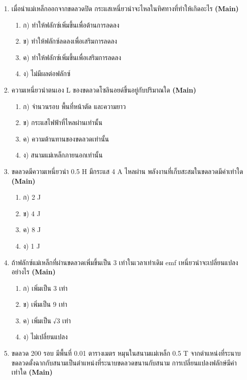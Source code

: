 \documentclass[12pt]{article}
\begin{document}
\begin{enumerate}[label=\arabic*.]
\begin{enumerate}[label=)]
\item ก) 100 V
\item ข) 200 V
\item ค) 50 V
\item ง) 250 V
\end{enumerate}
\item เมื่อนำแม่เหล็กออกจากขดลวดปิด กระแสเหนี่ยวนำจะไหลในทิศทางที่ทำให้เกิดอะไร \hfill \textbf{\small (Main)}
\begin{enumerate}[label=)]
\item ก) ทำให้ฟลักซ์เพิ่มขึ้นเพื่อต้านการลดลง
\item ข) ทำให้ฟลักซ์ลดลงเพื่อเสริมการลดลง
\item ค) ทำให้ฟลักซ์เพิ่มขึ้นเพื่อเสริมการลดลง
\item ง) ไม่มีผลต่อฟลักซ์
\end{enumerate}
\item ความเหนี่ยวนำตนเอง L ของขดลวดโซลินอยด์ขึ้นอยู่กับปริมาณใด \hfill \textbf{\small (Main)}
\begin{enumerate}[label=)]
\item ก) จำนวนรอบ พื้นที่หน้าตัด และความยาว
\item ข) กระแสไฟฟ้าที่ไหลผ่านเท่านั้น
\item ค) ความต้านทานของขดลวดเท่านั้น
\item ง) สนามแม่เหล็กภายนอกเท่านั้น
\end{enumerate}
\item ขดลวดมีความเหนี่ยวนำ 0.5 H มีกระแส 4 A ไหลผ่าน พลังงานที่เก็บสะสมในขดลวดมีค่าเท่าใด \hfill \textbf{\small (Main)}
\begin{enumerate}[label=)]
\item ก) 2 J
\item ข) 4 J
\item ค) 8 J
\item ง) 1 J
\end{enumerate}
\item ถ้าฟลักซ์แม่เหล็กที่ผ่านขดลวดเพิ่มขึ้นเป็น 3 เท่าในเวลาเท่าเดิม emf เหนี่ยวนำจะเปลี่ยนแปลงอย่างไร \hfill \textbf{\small (Main)}
\begin{enumerate}[label=)]
\item ก) เพิ่มเป็น 3 เท่า
\item ข) เพิ่มเป็น 9 เท่า
\item ค) เพิ่มเป็น √3 เท่า
\item ง) ไม่เปลี่ยนแปลง
\end{enumerate}
\item ขดลวด 200 รอบ มีพื้นที่ 0.01 ตารางเมตร หมุนในสนามแม่เหล็ก 0.5 T จากตำแหน่งที่ระนาบขดลวดตั้งฉากกับสนามเป็นตำแหน่งที่ระนาบขดลวดขนานกับสนาม การเปลี่ยนแปลงฟลักษ์มีค่าเท่าใด \hfill \textbf{\small (Main)}

\end{enumerate}
\end{document}

